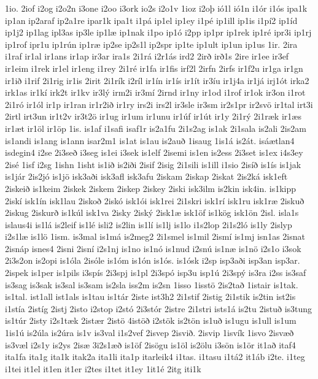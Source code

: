 {1io.
2iof
i2og
i2o2n
i3one
i2oo
i3ork
io2s
i2o1v
1ioz
i2oþ
ió1l
ió1n
i1ór
i1ós
ipa1k
ip1an
ip2araf
ip2a1re
ipar1k
ipa1t
i1pá
ip1el
ip1ey
i1pé
ip1ill
ip1is
i1pí2
ip1íd
ip1j2
ip1lag
ipl3as
ip3le
ip1læ
ip1nak
i1po
ip1ó
i2pp
ip1pr
ip1rek
ip1ré
ipr3i
ip1rj
ip1rof
ipr1u
ip1rún
ip1ræ
ip2se
ip2s1l
ip2spr
ip1te
ip1ult
ip1un
ip1us
1ir.
2ira
i1raf
ir1al
ir1ans
ir1ap
ir3ar
ira1s
2i1rá
i2r1ás
ird2
2irð
irð1s
2ire
ir1ee
ir3ef
ir1eim
i1rek
ir1el
ir1eng
i1rey
2i1ré
ir1fa
ir1fis
irf2l
2irfn
2irfs
ir1f2u
ir1ga
ir1gn
ir1ið
i1rif
2i1rig
ir1is
2irit
2i1rík
i2ríl
ir1ín
ir1ís
ir1ít
ir3íu
ir1j4a
ir1já
irj1ót
irka2
irk1as
ir1kí
irk2t
ir1kv
ir3lý
irm2i
ir3mí
2irnd
ir1ny
ir1od
i1rof
ir1ok
ir3on
i1rot
2i1ró
ir1ól
ir1p
ir1ran
ir1r2ið
ir1ry
irs2i
irs2l
ir3sle
ir3sm
ir2s1pr
ir2svö
ir1tal
irt3i
2irtl
irt3un
ir1t2v
ir3t2ö
ir1ug
ir1um
ir1unu
ir1úf
ir1út
ir1y
2i1rý
2i1ræk
ir1æs
ir1æt
ir1öl
ir1öp
1is.
is1af
i1safi
isaf1r
is2a1fu
2i1s2ag
is1ak
2i1sala
is2ali
2is2am
is1andi
is1ang
is1ann
isar2m1
is1at
is1au
is2auð
1isaug
1is1á
is2át.
isáætlan4
isdegin4
i2se
2i3seð
i3seg
is1ei
i3sek
is1elf
2isemi
is1en
is2ess
2i3set
is1ex
i4s3ey
2isé
1isf
i2sg
1ishn
1isht
is1ið
is2iði
2isif
2isig
2i1sili
is1ill
i1sio
2isíð
is1ís
is1jak
is1jár
2is2jó
is1jö
isk3aði
isk3afl
isk3afu
2iskam
2iskap
2iskat
2is2ká
isk1eft
2iskeið
is1keim
2iskek
2iskem
2iskep
2iskey
2iski
isk3ilm
is2kin
isk4in.
is1kipp
2iskí
isk1ín
isk1lau
2iskoð
2iskó
isk1ói
isk1rei
2i1skri
isk1rí
isk1ru
isk1ræ
2iskuð
2iskug
2iskurð
is1kúl
isk1va
2isky
2iský
2isk1æ
isk1öf
is1kög
isk1ön
2isl.
isla1s
islaus4i
is1lá
is2leif
is1lé
isli2
is2lin
is1lí
is1lj
is1lo
i1s2lop
2i1s2ló
is1ly
2islyp
i2s1læ
is1lö
1ism.
is3mal
is1má
is2meg2
2i1smel
is1mil
2ismí
is1mj
isn1as
2isnat
2isnáp
isnes4
2isni
2isní
i2s1nj
is1no
is1nó
is1nud
i2snú
is1næ
is1nö
i2s1o
i3sok
2i3s2on
is2opi
is1óla
2isóle
is1óm
is1ón
is1ós.
is1ósk
i2sp
isp3aði
isp3an
isp3ar.
2ispek
is1per
is1pils
i3spís
2i3spj
is1pl
2i3spó
isp3u
isp1ú
2i3spý
is3ra
i2ss
is3saf
is3sag
is3sak
is3sal
is3sam
is2sla
iss2m
is2sn
1isso
1isstö
2is2tað
1istair
is1tak.
is1tal.
ist1all
ist1als
is1tau
is1tár
2iste
ist3h2
2i1stif
2istig
2i1stik
is2tin
ist2is
i1stía
2istíg
2istj
2isto
i2stop
i2stó
2i3stór
2istre
2i1stri
ists1á
is2tu
2istuð
is3tung
is1túr
2isty
i2s1tæk
2istær
2istö
4istöð
i2stök
is2tön
is1uð
is1ugu
is1ull
is1um
1is1ú
is2úla
is2úra
is1v
is3val
i1s2vef
2isvep
2isvið.
2isvip
1isvík
1isvo
2isvæð
is3væl
i2s1y
is2ys
2isæ
3i2s1æð
is1öf
2isögu
is1öl
is2ölu
i3sön
is1ör
it1að
itaf4
ita1fa
ita1g
ita1k
itak2a
ita1li
ita1p
itarleik4
i1tas.
i1tasu
i1tá2
it1áb
i2te.
i1teg
i1tei
it1el
it1en
it1er
i2tes
i1tet
it1ey
1it1é
2itg
iti1k
}
